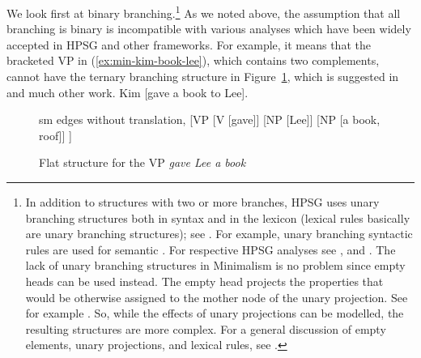 \documentclass[output=paper,biblatex,babelshorthands,newtxmath,draftmode,colorlinks,citecolor=brown]{langscibook}
\begin{document}
We\label{minimalism:page-binding-branching-start} look first at binary branching.\footnote{
  In addition to structures with two or more branches, HPSG uses unary branching structures both in syntax
  and in the lexicon (lexical rules basically are unary branching structures); see
  .
  For example, unary branching syntactic rules are used for semantic 
  \citep{Partee86a-u}. For respective HPSG analyses see ,
   and . The lack of unary branching structures in Minimalism is
  no problem since empty heads can be used instead. The empty head projects the
  properties that would be otherwise assigned to the mother node of the unary projection. See for
  example . So, while the effects of unary projections can be
  modelled, the resulting structures are more complex. For a general discussion of empty elements,
  unary projections, and lexical rules, see .
% 
} As we noted above, the assumption that all branching is binary is incompatible with various
analyses which have been widely accepted in HPSG and other frameworks. For example, it means that
the bracketed VP in (\ref{ex:min-kim-book-lee}), which contains two complements, cannot have the
ternary branching structure in Figure~\ref{fig:gave-lee-book}, which is suggested in  and much other work.
\ea
Kim [gave a book to Lee].\label{ex:min-kim-book-lee}
\z
\begin{figure}
	\centering
	\begin{forest} sm edges without translation, 
		[VP
		[V [gave]] [NP [Lee]] [NP [a book, roof]]
		]
	\end{forest}
	\caption{\label{fig:gave-lee-book}Flat structure for the VP \emph{gave Lee a book}}
\end{figure}
\end{document}
